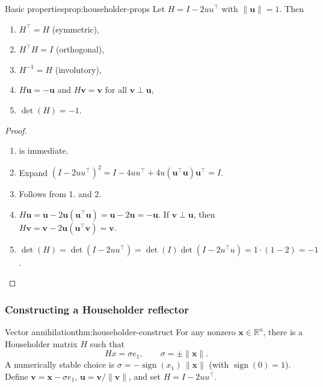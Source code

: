 \documentclass[../../main.tex]{subfiles}
\begin{document}
\begin{proposition}{Basic properties}{prop:householder-props}
    Let $H=I-2uu^\top$ with $\|\mathbf{u}\|=1$. Then
    \begin{enumerate}
        \item $H^\top=H$ (symmetric),
        \item $H^\top H=I$ (orthogonal),
        \item $H^{-1}=H$ (involutory),
        \item $H\mathbf{u} = -\mathbf{u}$ and $H\mathbf{v} = \mathbf{v}$ for all $\mathbf{v} \perp \mathbf{u}$,
        \item $\det(H)=-1$.
    \end{enumerate}
\end{proposition}
\begin{proof}
    \begin{enumerate}
        \item is immediate.
        \item Expand $(I-2uu^\top)^2=I-4uu^\top+4u(\mathbf{u}^\top \mathbf{u})\mathbf{u}^\top=I$.
        \item Follows from 1. and 2.
        \item $H\mathbf{u}=\mathbf{u}-2\mathbf{u}(\mathbf{u}^\top \mathbf{u})=\mathbf{u}-2\mathbf{u}=-\mathbf{u}$.
              If $\mathbf{v}\perp \mathbf{u}$, then $H\mathbf{v}=\mathbf{v}-2\mathbf{u}(\mathbf{u}^\top \mathbf{v})=\mathbf{v}$.
        \item $\det(H)=\det(I-2uu^\top)=\det(I)\det(I-2u^\top u)=1\cdot(1-2)=-1$.
    \end{enumerate}
\end{proof}

\subsubsection{Constructing a Householder reflector}

\begin{theorem}{Vector annihilation}{thm:householder-construct}
    For any nonzero $\mathbf{x}\in\mathbb{R}^n$, there is a Householder matrix $H$ such that
    \[
        Hx = \sigma e_1,\qquad \sigma=\pm\|\mathbf{x}\|.
    \]
    A numerically stable choice is $\displaystyle \sigma = -\operatorname{sign}(x_1)\,\|\mathbf{x}\|$ (with $\operatorname{sign}(0)=1$).
    Define $\mathbf{v}=\mathbf{x}-\sigma e_1$, $\mathbf{u}=\mathbf{v}/\|\mathbf{v}\|$, and set $H=I-2uu^\top$.
\end{theorem}
\end{document}
